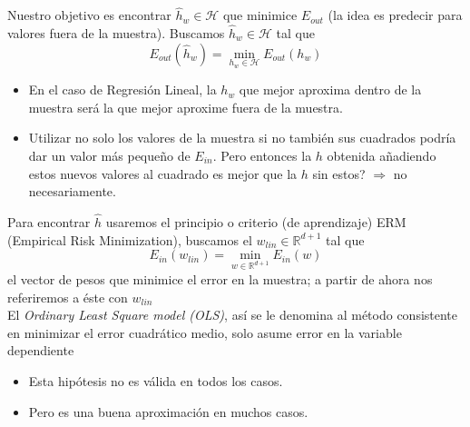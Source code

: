 \documentclass[11pt,a4paper]{article}
\theoremstyle{definition}
\newcommand{\R}{\mathbb{R}}
\begin{document}
	Nuestro objetivo es encontrar $\hat h_w \in \mathcal{H}$  que minimice $E_{out}$ (la idea es predecir para valores fuera de la muestra). Buscamos $\hat h_w \in \mathcal{H}$ tal que
	$$E_{out}(\hat h_w)=\min_{h_w\in \mathcal{H}} E_{out} (h_w)$$
	
	\begin{itemize}
	\item	En el caso de Regresión Lineal, la $h_w$ que mejor aproxima dentro de la muestra será la que mejor aproxime fuera de la muestra.
	\item Utilizar no solo los valores de la muestra si no también sus cuadrados podría dar un valor más pequeño de $E_{in}$. Pero entonces la $h$ obtenida añadiendo estos nuevos valores al cuadrado es mejor que la $h$ sin estos? $\Rightarrow$ no necesariamente.
	\end{itemize}
	
	Para encontrar $\hat h$ usaremos el principio o criterio (de aprendizaje) ERM (Empirical Risk Minimization), buscamos el $w_{lin}\in \R^{d+1}$ tal que
	$$E_{in}(w_{lin})=\min_{w\in \R^{d+1}} E_{in}(w)$$
	el vector de pesos que minimice el error en la muestra; a partir de ahora nos referiremos a éste con $w_{lin}$\\
	
	El \textit{Ordinary Least Square model (OLS)}, así se le denomina al método consistente en minimizar el error cuadrático medio, solo asume error en la variable dependiente
	\begin{itemize}
		\item Esta hipótesis no es válida en todos los casos.
		\item Pero es una buena aproximación en muchos casos.
	\end{itemize}
	
\end{document}

